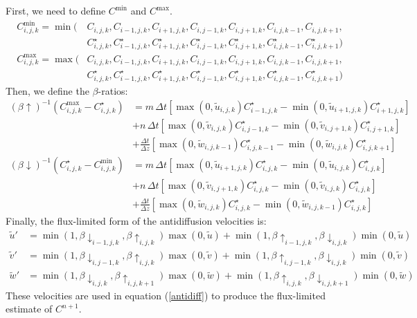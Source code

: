 First, we need to define $C^{\min}$ and $C^{\max}$.
\begin{align*}
  C^{\min}_{i,j,k} = \min ( &C_{i,j,k}, C_{i-1,j,k},
  C_{i+1,j,k},
  C_{i,j-1,k}, C_{i,j+1,k}, C_{i,j,k-1}, C_{i,j,k+1}, \\ 
  &C_{i,j,k}^\star, C_{i-1,j,k}^\star, C_{i+1,j,k}^\star,
  C_{i,j-1,k}^\star, C_{i,j+1,k}^\star, C_{i,j,k-1}^\star,
  C_{i,j,k+1}^\star ) \\
  C^{\max}_{i,j,k} = \max ( &C_{i,j,k}, C_{i-1,j,k},
  C_{i+1,j,k},
  C_{i,j-1,k}, C_{i,j+1,k}, C_{i,j,k-1}, C_{i,j,k+1}, \\
  &C_{i,j,k}^\star, C_{i-1,j,k}^\star, C_{i+1,j,k}^\star,
  C_{i,j-1,k}^\star, C_{i,j+1,k}^\star, C_{i,j,k-1}^\star,
  C_{i,j,k+1}^\star  )
\end{align*}
Then, we define the $\beta$-ratios:
\begin{align*}
  \left(\beta\! \uparrow \right)^{-1}
  \left(C^{\max}_{i,j,k} - C^\star_{i,j,k} \right) &=
  m \,\Delta t \left[ \max (0,\tilde{u}_{i,j,k}) C^\star_{i-1,j,k} - 
         \min (0,\tilde{u}_{i+1,j,k}) C^\star_{i+1,j,k} \right]
	 \\ &+
  n \,\Delta t \left[ \max (0,\tilde{v}_{i,j,k}) C^\star_{i,j-1,k} - 
         \min (0,\tilde{v}_{i,j+1,k}) C^\star_{i,j+1,k} \right]
	 \\ &+
  \frac{\Delta t}{\Delta z}
	     \left[ \max (0,\tilde{w}_{i,j,k-1}) C^\star_{i,j,k-1} - 
         \min (0,\tilde{w}_{i,j,k}) C^\star_{i,j,k+1} \right]  \\
  \left(\beta\! \downarrow \right)^{-1}
  \left(C^\star_{i,j,k} - C^{\min}_{i,j,k} \right) &=
  m \,\Delta t \left[ \max (0,\tilde{u}_{i+1,j,k}) C^\star_{i,j,k} - 
         \min (0,\tilde{u}_{i,j,k}) C^\star_{i,j,k} \right]
	 \\ &+
  n \,\Delta t \left[ \max (0,\tilde{v}_{i,j+1,k}) C^\star_{i,j,k} - 
         \min (0,\tilde{v}_{i,j,k}) C^\star_{i,j,k} \right]
	 \\ &+
  \frac{\Delta t}{\Delta z}
	     \left[ \max (0,\tilde{w}_{i,j,k}) C^\star_{i,j,k} - 
         \min (0,\tilde{w}_{i,j,k-1}) C^\star_{i,j,k} \right] 
\end{align*}
Finally, the flux-limited form of the antidiffusion velocities is:
\begin{align}
  \tilde{u}' &= \min(1, \beta\! \downarrow_{i-1,j,k},
      \beta\! \uparrow_{i,j,k}) \max(0, \tilde{u}) +
                \min(1, \beta\! \uparrow_{i-1,j,k},
		\beta\! \downarrow_{i,j,k}) \min(0, \tilde{u})  \\
  \tilde{v}' &= \min(1, \beta\! \downarrow_{i,j-1,k},
      \beta\! \uparrow_{i,j,k}) \max(0, \tilde{v}) +
                \min(1, \beta\! \uparrow_{i,j-1,k},
		\beta\! \downarrow_{i,j,k}) \min(0, \tilde{v})  \\
  \tilde{w}' &= \min(1, \beta\! \downarrow_{i,j,k},
      \beta\! \uparrow_{i,j,k+1}) \max(0, \tilde{w}) +
                \min(1, \beta\! \uparrow_{i,j,k},
		\beta\! \downarrow_{i,j,k+1}) \min(0, \tilde{w})
\end{align}
These velocities are used in equation (\ref{antidiff}) to produce the
flux-limited estimate of $C^{n+1}$.


